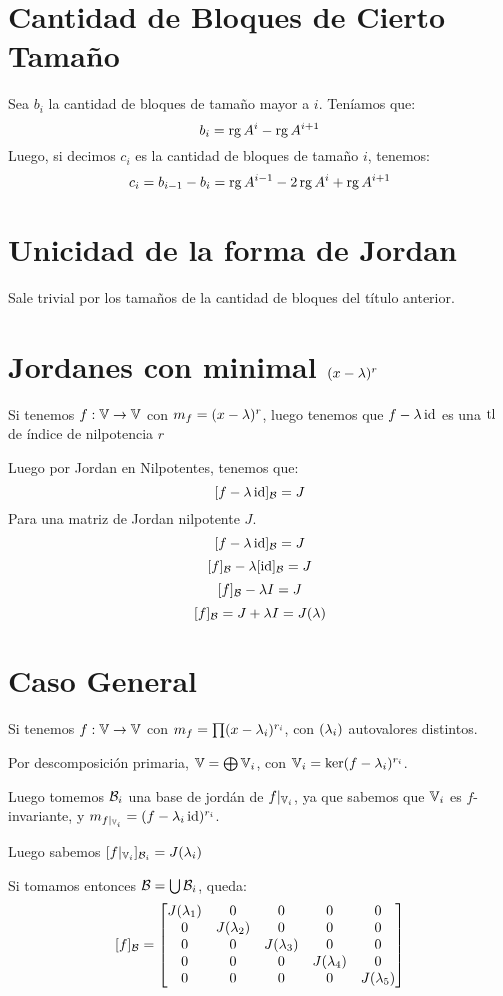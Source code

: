 \documentclass{article}
\begin{document}
\section*{Cantidad de Bloques de Cierto Tamaño}
Sea $b_i$ la cantidad de bloques de tamaño mayor a $i$. Teníamos que:
\[
	b_i = \operatorname{rg} A^i - \operatorname{rg} A^{i+1}
\]
Luego, si decimos $c_i$ es la cantidad de bloques de tamaño $i$, tenemos:
\[
	c_i = b_{i-1} - b_i = \operatorname{rg} A^{i-1} - 2\operatorname{rg} A^i + \operatorname{rg} A^{i+1}
\]
\section*{Unicidad de la forma de Jordan}
Sale trivial por los tamaños de la cantidad de bloques del título anterior.

\section*{Jordanes con minimal $(x - \lambda)^r$}
Si tenemos $f : \mathbb{V} \to \mathbb{V}$ con $m_f = (x-\lambda)^r$, luego tenemos que $f - \lambda \operatorname{id}$ es una $\operatorname{tl}$ de índice de nilpotencia $r$

Luego por Jordan en Nilpotentes, tenemos que:
\[
	[f-\lambda \operatorname{id}]_{\mathcal{B}} = J
\]
Para una matriz de Jordan nilpotente $J$.
\[
	[f-\lambda \operatorname{id}]_{\mathcal{B}} = J
\]
\[
	[f]_{\mathcal{B}} - \lambda [\operatorname{id}]_{\mathcal{B}} = J
\]
\[
	[f]_{\mathcal{B}} - \lambda I = J
\]
\[
	[f]_{\mathcal{B}} = J + \lambda I = J(\lambda)
\]

\section*{Caso General}
Si tenemos $f : \mathbb{V} \to \mathbb{V}$ con $m_f = \prod (x - \lambda_i)^{r_i}$, con $(\lambda_i)$ autovalores distintos.

Por descomposición primaria, $\mathbb{V} = \bigoplus \mathbb{V}_i$, con $\mathbb{V}_i = \ker (f - \lambda_i)^{r_i}$.

Luego tomemos $\mathcal{B}_i$ una base de jordán de $f|_{\mathbb{V}_i}$, ya que sabemos que $\mathbb{V}_i$ es $f$-invariante, y $m_{f|_{\mathbb{V}_i}} = (f - \lambda_i \operatorname{id})^{r_i}$.

Luego sabemos $[f|_{\mathbb{V}_i}]_{\mathcal{B}_i} = J(\lambda_i)$

Si tomamos entonces $\mathcal{B} = \bigcup \mathcal{B}_i$, queda:
\[
	[f]_{\mathcal{B}} =
	\begin{bmatrix}
		J(\lambda_1) & 0 & 0 & 0 & 0 \\
		0 & J(\lambda_2) & 0 & 0 & 0 \\
		0 & 0 & J(\lambda_3) & 0 & 0 \\
		0 & 0 & 0 & J(\lambda_4) & 0 \\
		0 & 0 & 0 & 0 & J(\lambda_5) \\
	\end{bmatrix}
\]
\end{document}
